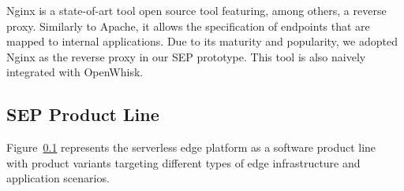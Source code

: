 Nginx is a state-of-art tool open source tool featuring, among others, a reverse proxy. Similarly to Apache, it allows the specification of endpoints that are mapped to internal applications. Due to its maturity and popularity, we adopted Nginx as the reverse proxy in our SEP prototype. This tool is also naively integrated with OpenWhisk.

\subsection{SEP Product Line}

Figure~\ref{} represents the serverless edge platform as a software product line~\cite{} with product variants targeting different types of edge infrastructure and application scenarios.
